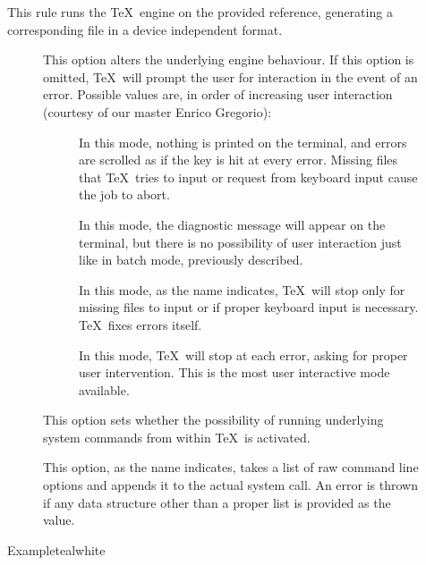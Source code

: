 \begin{description}
\item[]
This rule runs the  \TeX\ engine on the provided  reference, generating a corresponding file in a device independent format.

\begin{description}
\item[] This option alters the underlying engine behaviour. If this option is omitted, \TeX\ will prompt the user for interaction in the event of an error. Possible values are, in order of increasing user interaction (courtesy of our master Enrico Gregorio):

\begin{description}
\item[] In this mode, nothing is printed on the terminal, and errors are scrolled as if the  key is hit at every error. Missing files that \TeX\ tries to input or request from keyboard input cause the job to abort.

\item[] In this mode, the diagnostic message will appear on the terminal, but there is no possibility of user interaction just like in batch mode, previously described.

\item[] In this mode, as the name indicates, \TeX\ will stop only for missing files to input or if proper keyboard input is necessary. \TeX\ fixes errors itself.

\item[] In this mode, \TeX\ will stop at each error, asking for proper user intervention. This is the most user interactive mode available.
\end{description}

\item[] This option sets whether the possibility of running underlying system commands from within \TeX\ is activated.

\item[] This option, as the name indicates, takes a list of raw command line options and appends it to the actual system call. An error is thrown if any data structure other than a proper list is provided as the value.
\end{description}

\begin{codebox}{Example}{teal}{\icnote}{white}
\end{codebox}


\end{description}
